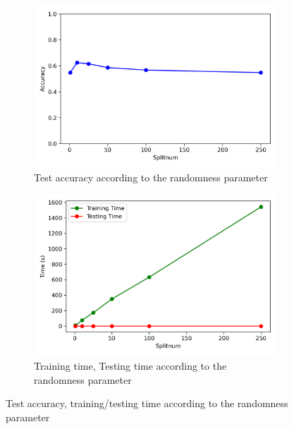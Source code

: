 \begin{figure}
	\centering
	\begin{subfigure}[t]{0.4\linewidth}
		\centering
		\includegraphics[width=\linewidth]{image/q5-fig4.png}
		\caption{Test accuracy according to the randomness parameter}
		\label{fig:q5-fig4}
	\end{subfigure}%
	\quad
	\begin{subfigure}[t]{0.4\linewidth}
		\centering
		\includegraphics[width=\linewidth]{image/q5-fig5.png}
		\caption{Training time, Testing time according to the randomness parameter}
		\label{fig:q5-fig5}
	\end{subfigure}
	\caption{Test accuracy, training/testing time according to the randomness parameter}
\end{figure}

